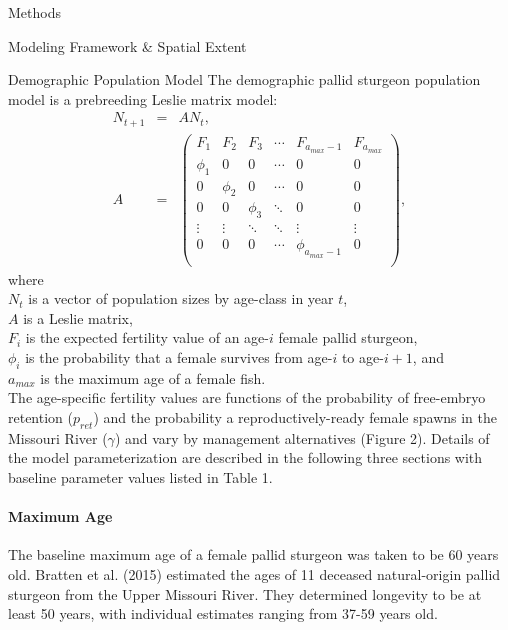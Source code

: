 \documentclass[12pt]{article}
\begin{document}
\begin{section}{Methods}
\begin{subsection}{Modeling Framework \& Spatial Extent}
\begin{subsubsection}{Demographic Population Model}
The demographic pallid sturgeon population model is a prebreeding Leslie matrix model:
\begin{eqnarray}
N_{t+1} & = & AN_{t},\\
A & = &  \begin{pmatrix}
F_1 & F_2 & F_3 & \cdots & F_{a_{max}-1} & F_{a_{max}}\\
\phi_1 & 0 & 0 & \cdots  & 0 & 0\\
0 & \phi_2 & 0 & \cdots  & 0 & 0\\
0 & 0 & \phi_3 & \ddots & 0 & 0\\
\vdots & \vdots & \ddots  & \ddots & \vdots & \vdots\\
0 & 0 & 0 & \cdots & \phi_{a_{max}-1} & 0\\
\end{pmatrix},
\end{eqnarray}
where\\
\hspace*{0.5cm}$N_t$ is a vector of population sizes by age-class in year $t$,\\
\hspace*{0.5cm}$A$ is a Leslie matrix,\\
\hspace*{0.5cm}$F_i$ is the expected fertility value of an age-$i$ female pallid sturgeon,\\
\hspace*{0.5cm}$\phi_i$ is the probability that a female survives from age-$i$ to age-$i+1$, and\\
\hspace*{0.5cm}$a_{max}$ is the maximum age of a female fish.\\

The age-specific fertility values are functions of the probability of free-embryo retention ($p_{ret}$) and the probability a reproductively-ready female spawns in the Missouri River ($\gamma$) and vary by management alternatives (Figure 2).  Details of the model parameterization are described in the following three sections with baseline parameter values listed in Table 1.\\

\paragraph{Maximum Age}
The baseline maximum age of a female pallid sturgeon was taken to be 60 years old.  Bratten et al. (2015) estimated the ages of 11 deceased natural-origin pallid sturgeon from the Upper Missouri River.  They determined longevity to be at least 50 years, with individual estimates ranging from 37-59 years old.\\


\end{subsubsection}
\end{subsection}
\end{section}
\end{document}
